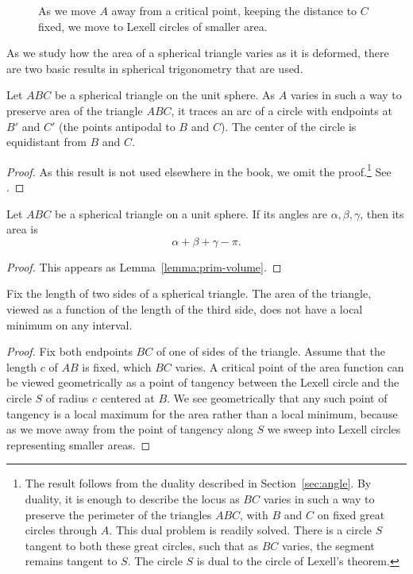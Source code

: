 \begin{figure}[htb]
  \centering
  \caption{As we move $A$ away from a critical
point, keeping the distance to $C$ fixed, we move to Lexell
circles of smaller area.}
  \label{fig:13:A}
\end{figure}

As we study how the area of a spherical triangle varies as it is deformed,
there are two basic results in spherical trigonometry that are used.

\begin{lemma}[Lexell] Let $ABC$ be a spherical triangle on the unit sphere.  As $A$ varies
in such a way to preserve area of the triangle $ABC$, it traces an arc of
a circle with endpoints at $B'$ and $C'$ (the points antipodal to $B$ and $C$).
The center of the circle is equidistant from $B$ and $C$.
\end{lemma}

\begin{proof} As this result is not used elsewhere in the book, we omit the proof.\footnote{The result follows from the duality described in Section~\ref{sec:angle}.  By duality, it is enough to describe the locus as $BC$ varies
in such a way to preserve the perimeter of the triangles $ABC$, with
$B$ and $C$ on fixed great circles through $A$.  This dual problem is
readily solved.
There is a circle $S$ tangent to both these great circles, such that
as $BC$ varies, 
the segment remains tangent to $S$.  The circle $S$ is dual
to the circle of Lexell's theorem.}
See \cite{Fej72}.
\end{proof}

\begin{lemma}[Girard] Let $ABC$ be a spherical triangle on a unit sphere. If its angles
are $\alpha,\beta,\gamma$, then its area is
   $$
   \alpha+\beta+\gamma-\pi.
   $$
\end{lemma}

\begin{proof} This appears as Lemma~\ref{lemma:prim-volume}.
\end{proof}

\begin{lemma} Fix the length of two sides of a spherical triangle.
The area of the triangle, viewed as a function of the length of
the third side, does not have a local minimum on any interval.
\end{lemma}

\begin{proof}  Fix both endpoints $BC$ of one of sides of the triangle.
Assume that the length $c$ of $AB$ is fixed, which $BC$
varies. A critical point of the area function can be viewed
geometrically as a point of tangency between the Lexell circle 
and the circle $S$ of radius $c$ centered at $B$.
We see geometrically that any such point of tangency is a local
maximum for the area rather than a local minimum, because as we
move away from the point of tangency along $S$ we sweep into
Lexell circles representing smaller areas.
\end{proof}

